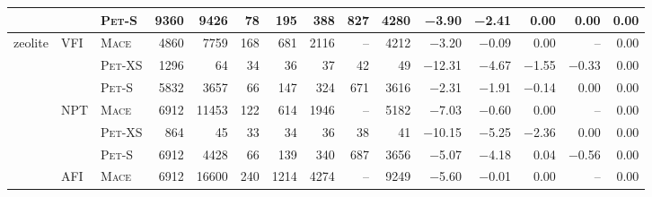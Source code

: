 \begin{tabular}{lllr rrrrrr rrrrr}
                  &                    &    \textsc{Pet}-S  &        \num{9360}  &        \num{9426}  &          \num{78}  &         \num{195}  &         \num{388}  &         \num{827}  &        \num{4280}  &       \num{-3.90}  &       \num{-2.41}  &        \num{0.00}  &        \num{0.00}  &        \num{0.00} \\ 
\midrule
         zeolite  &               VFI  &     \textsc{Mace}  &        \num{4860}  &        \num{7759}  &         \num{168}  &         \num{681}  &        \num{2116}  &                --  &        \num{4212}  &       \num{-3.20}  &       \num{-0.09}  &        \num{0.00}  &                --  &        \num{0.00} \\ 
                  &                    &   \textsc{Pet}-XS  &        \num{1296}  &          \num{64}  &          \num{34}  &          \num{36}  &          \num{37}  &          \num{42}  &          \num{49}  &      \num{-12.31}  &       \num{-4.67}  &       \num{-1.55}  &       \num{-0.33}  &        \num{0.00} \\ 
                  &                    &    \textsc{Pet}-S  &        \num{5832}  &        \num{3657}  &          \num{66}  &         \num{147}  &         \num{324}  &         \num{671}  &        \num{3616}  &       \num{-2.31}  &       \num{-1.91}  &       \num{-0.14}  &        \num{0.00}  &        \num{0.00} \\ 
\addlinespace
                  &               NPT  &     \textsc{Mace}  &        \num{6912}  &       \num{11453}  &         \num{122}  &         \num{614}  &        \num{1946}  &                --  &        \num{5182}  &       \num{-7.03}  &       \num{-0.60}  &        \num{0.00}  &                --  &        \num{0.00} \\ 
                  &                    &   \textsc{Pet}-XS  &         \num{864}  &          \num{45}  &          \num{33}  &          \num{34}  &          \num{36}  &          \num{38}  &          \num{41}  &      \num{-10.15}  &       \num{-5.25}  &       \num{-2.36}  &        \num{0.00}  &        \num{0.00} \\ 
                  &                    &    \textsc{Pet}-S  &        \num{6912}  &        \num{4428}  &          \num{66}  &         \num{139}  &         \num{340}  &         \num{687}  &        \num{3656}  &       \num{-5.07}  &       \num{-4.18}  &        \num{0.04}  &       \num{-0.56}  &        \num{0.00} \\ 
\addlinespace
                  &               AFI  &     \textsc{Mace}  &        \num{6912}  &       \num{16600}  &         \num{240}  &        \num{1214}  &        \num{4274}  &                --  &        \num{9249}  &       \num{-5.60}  &       \num{-0.01}  &        \num{0.00}  &                --  &        \num{0.00} \\ 

\end{tabular}
